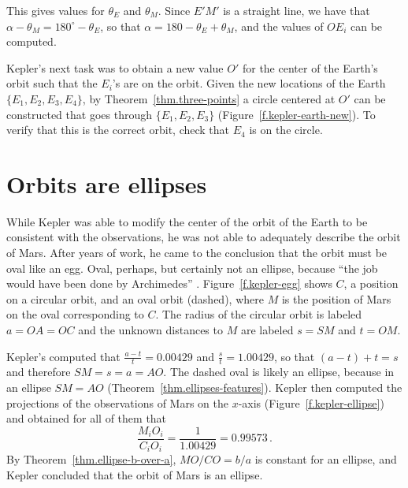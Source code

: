 
This gives values for $\theta_E$ and $\theta_M$. Since $E'M'$ is a straight line, we have that $\alpha-\theta_M = 180^\circ -\theta_E$, so that $\alpha = 180 - \theta_E + \theta_M$, and the values of $OE_i$ can be computed.

Kepler's next task was to obtain a new value $O'$ for the center of the Earth's orbit such that the $E_i$'s are on the orbit. Given the new locations of the Earth $\{E_1,E_2,E_3,E_4\}$, by Theorem~\ref{thm.three-points} a circle centered at $O'$ can be constructed that goes through $\{E_1,E_2,E_3\}$ (Figure~\ref{f.kepler-earth-new}). To verify that this is the correct orbit, check that $E_4$ is on the circle.


\section{Orbits are ellipses}

While Kepler was able to modify the center of the orbit of the Earth to be consistent with the observations, he was not able to adequately describe the orbit of Mars. After years of work, he came to the conclusion that the orbit must be oval like an egg. Oval, perhaps, but certainly not an ellipse, because ``the job would have been done by Archimedes'' \cite[p.~94]{hahn-cic}. Figure~\ref{f.kepler-egg} shows $C$, a position on a circular orbit, and an oval orbit (dashed), where $M$ is the position of Mars on the oval corresponding to $C$. The radius of the circular orbit is labeled $a=OA=OC$ and the unknown distances to $M$ are labeled $s=SM$ and $t=OM$.

Kepler's computed that $\frac{a-t}{t} = 0.00429$ and $\frac{s}{t} = 1.00429$, so that $(a-t)+t=s$ and therefore $SM=s=a=AO$. The dashed oval is likely an ellipse, because in an ellipse $SM=AO$ (Theorem~\ref{thm.ellipses-features}). Kepler then computed the projections of the observations of Mars on the $x$-axis (Figure~\ref{f.kepler-ellipse}) and obtained for all of them that
\[
\frac{M_iO_i}{C_iO_i} = \frac{1}{1.00429}=0.99573\,.
\]
By Theorem~\ref{thm.ellipse-b-over-a}, $MO/CO=b/a$ is constant for an ellipse, and Kepler concluded that the orbit of Mars is an ellipse.


